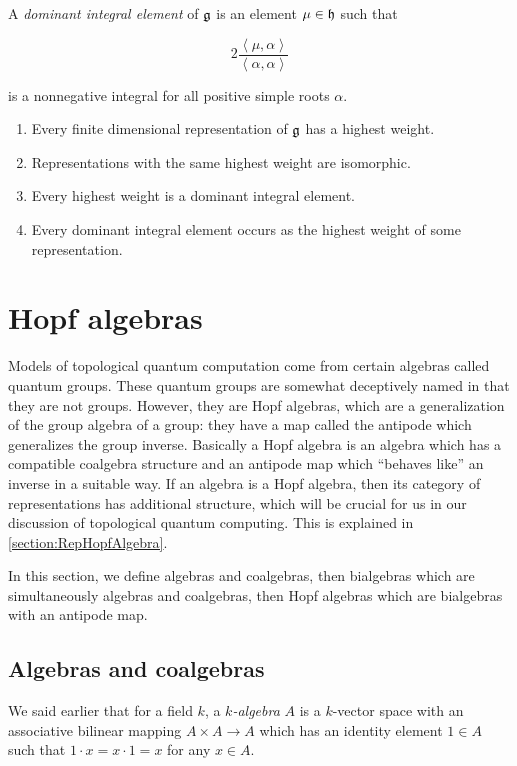 \begin{defn}
A \emph{dominant integral element} of $\mathfrak{g}$ is an element $\mu \in \mathfrak{h}$ such that

\begin{equation}
2 \frac{\left<\mu,\alpha\right>}{\left<\alpha,\alpha\right>}
\end{equation}

is a nonnegative integral for all positive simple roots $\alpha$.
\end{defn}
\begin{theorem}
\begin{enumerate}
\item Every finite dimensional representation of $\mathfrak{g}$ has a highest weight.
\item Representations with the same highest weight are isomorphic.
\item Every highest weight is a dominant integral element.
\item Every dominant integral element occurs as the highest weight of some representation.
\end{enumerate}
\end{theorem}



\section{Hopf algebras}

Models of topological quantum computation come from certain algebras called
quantum groups. These quantum groups are somewhat deceptively named in that
they are not groups. However, they are Hopf algebras, which  are a
generalization of the group algebra of a group: they have a map called the
antipode which generalizes the group inverse. Basically a Hopf algebra is an
algebra which has a compatible coalgebra structure and an antipode map which
``behaves like'' an inverse in a suitable way. If an algebra is a Hopf algebra,
then its category of representations has additional structure, which will
be crucial for us in our discussion of topological quantum computing. This is
explained in \ref{section:RepHopfAlgebra}. 

In this section, we define algebras and coalgebras, then bialgebras which are
simultaneously algebras and coalgebras, then Hopf algebras which are bialgebras
with an antipode map.

\subsection{Algebras and coalgebras}
We said earlier that for a field $k$, a \emph{$k$-algebra} $A$ is a $k$-vector
space with an
associative bilinear mapping $A \times A \to A$ which has an identity element
$1 \in A$ such that $1\cdot x = x\cdot 1 = x$ for any $x \in A$.

